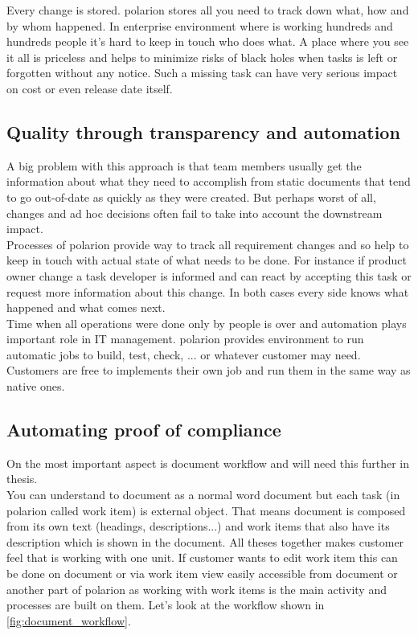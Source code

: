 \documentclass[thesis=M,english]{FITthesis}[2012/06/26]
\begin{document}
Every change is stored. \acrshort{polarion} stores all you need to track down what, how and by whom happened. In enterprise environment where is working hundreds and hundreds people it's hard to keep in touch who does what. A place where you see it all is priceless and helps to minimize risks of black holes when tasks is left or forgotten without any notice. Such a missing task can have very serious impact on cost or even release date itself.  

\subsection{Quality through transparency and automation}

A big problem with this approach is that team members usually get the information about what they need to accomplish from static documents that tend to go out-of-date as quickly as they were created. But perhaps worst of all, changes and ad hoc decisions often fail to take into account the downstream impact.\\

Processes of \acrshort{polarion} provide way to track all requirement changes and so help to keep in touch with actual state of what needs to be done. For instance if product owner change a task developer is informed and can react by accepting this task or request more information about this change. In both cases every side knows what happened and what comes next.\\

Time when all operations were done only by people is over and automation plays important role in IT management. \acrshort{polarion} provides environment to run automatic jobs to build, test, check, ... or whatever customer may need. Customers are free to implements their own job and run them in the same way as native ones.

\subsection{Automating proof of compliance}

On the most important aspect is document workflow and will need this further in thesis.\\ 

You can understand to document as a normal word document but each task (in \acrshort{polarion} called work item) is external object. That means document is composed from its own text (headings, descriptions...) and work items that also have its description which is shown in the document. All theses together makes customer feel that is working with one unit. If customer wants to edit work item this can be done on document or via work item view easily accessible from document or another part of \acrshort{polarion} as working with work items is the main activity and processes are built on them. Let's look at the workflow shown in \ref{fig:document_workflow}.
\end{document}
